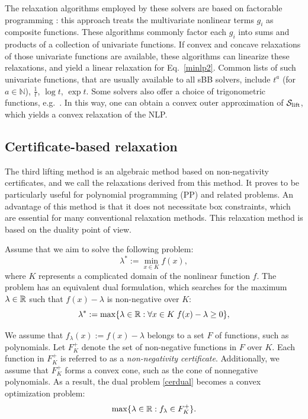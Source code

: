   
The relaxation algorithms employed by these solvers are based on factorable programming \cite{leoinbook, mccormick1976computability}: this approach treats the multivariate nonlinear terms $g_i$ as composite functions. These  algorithms commonly factor each $g_i$ into sums and products of a collection of univariate functions. If convex and concave relaxations of those univariate functions are available, these algorithms can linearize these relaxations, and yield a linear relaxation for Eq.~\eqref{minlp2}. Common lists of such univariate functions, that are usually available to all sBB solvers, include $t^a$ (for $a\in\mathbb{N}$), $\frac{1}{t}$, $\log{t}$, $\exp{t}$. Some solvers also offer a choice of trigonometric functions, e.g.~\couenne.  In this way, one can obtain a convex outer approximation of $\mathcal S_{\mathrm{lift}}$, which yields a convex relaxation of the NLP.


\subsection{Certificate-based relaxation}

The third lifting method is an algebraic method based on non-negativity certificates, and we call the relaxations derived from this method. It proves to be particularly useful for polynomial programming (PP) and related problems. An advantage of this method is that it does not necessitate box constraints, which are essential for many conventional relaxation methods. This relaxation method is based on the duality point of view.

Assume that we aim to solve the following problem:
\begin{equation}
\label{cerprim}
  \lambda^\ast :=  \min_{x \in K} f(x),
\end{equation}
where $K$ represents a complicated domain of the nonlinear function $f$. The problem has an equivalent dual formulation, which  searches for the maximum $\lambda \in \mathbb R$ such that $f(x) -\lambda$ is non-negative over $K$:
\begin{equation}
\label{cerdual}
  \lambda^\ast:=  \max \{\lambda\in \mathbb R: \forall x \in K\; f(x) - \lambda \ge 0\},
\end{equation}


We assume that $f_\lambda(x) := f(x) - \lambda$  belongs to a set $F$ of functions, such as polynomials. Let $F^{+}_{K}$ denote the set of non-negative functions in $F$ over $K$. Each function in $F^{+}_{K}$ is referred to as a \emph{non-negativity certificate}. Additionally, we assume that $F^{+}_{K}$ forms a convex cone, such as the cone of nonnegative polynomials. As a result, the dual problem \eqref{cerdual} becomes a convex optimization problem:
\begin{equation}
\label{cerdualre}
    \max \{\lambda\in \mathbb R: f_\lambda \in F^{+}_{K}\}.
\end{equation}

